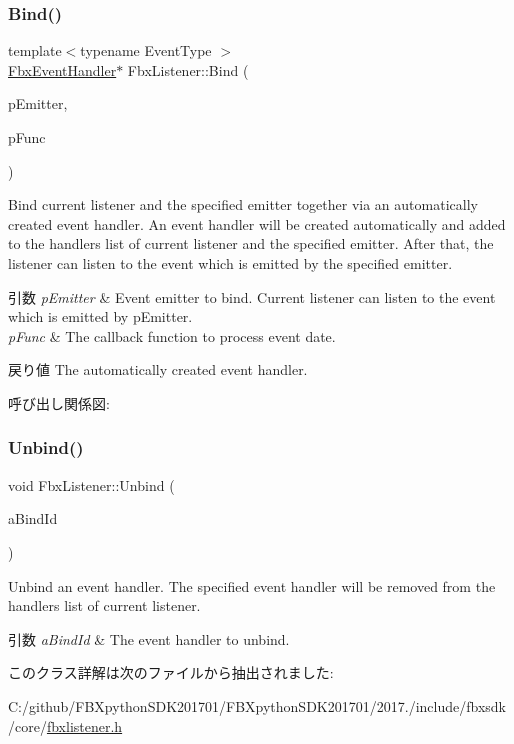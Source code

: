 \subsubsection{\texorpdfstring{Bind()}{Bind()}\hspace{0.1cm}{\footnotesize\ttfamily [3/3]}}
{\footnotesize\ttfamily template$<$typename Event\+Type $>$ \\
\hyperlink{class_fbx_event_handler}{Fbx\+Event\+Handler}$\ast$ Fbx\+Listener\+::\+Bind (\begin{DoxyParamCaption}\item[{\hyperlink{class_fbx_emitter}{Fbx\+Emitter} \&}]{p\+Emitter,  }\item[{void($\ast$)(const Event\+Type $\ast$, \hyperlink{class_fbx_listener}{Fbx\+Listener} $\ast$)}]{p\+Func }\end{DoxyParamCaption})}

Bind current listener and the specified emitter together via an automatically created event handler. An event handler will be created automatically and added to the handlers list of current listener and the specified emitter. After that, the listener can listen to the event which is emitted by the specified emitter. 
\begin{DoxyParams}{引数}
{\em p\+Emitter} & Event emitter to bind. Current listener can listen to the event which is emitted by p\+Emitter. \\
\hline
{\em p\+Func} & The callback function to process event date. \\
\hline
\end{DoxyParams}
\begin{DoxyReturn}{戻り値}
The automatically created event handler. 
\end{DoxyReturn}
呼び出し関係図\+:
\mbox{\label{class_fbx_listener_a723ba6f82b533e427d72ab39da3f8aeb}} 
\subsubsection{\texorpdfstring{Unbind()}{Unbind()}}
{\footnotesize\ttfamily void Fbx\+Listener\+::\+Unbind (\begin{DoxyParamCaption}\item[{const \hyperlink{class_fbx_event_handler}{Fbx\+Event\+Handler} $\ast$}]{a\+Bind\+Id }\end{DoxyParamCaption})}

Unbind an event handler. The specified event handler will be removed from the handlers list of current listener. 
\begin{DoxyParams}{引数}
{\em a\+Bind\+Id} & The event handler to unbind. \\
\hline
\end{DoxyParams}


このクラス詳解は次のファイルから抽出されました\+:\begin{DoxyCompactItemize}
\item 
C\+:/github/\+F\+B\+Xpython\+S\+D\+K201701/\+F\+B\+Xpython\+S\+D\+K201701/2017./include/fbxsdk/core/\hyperlink{fbxlistener_8h}{fbxlistener.\+h}\end{DoxyCompactItemize}
